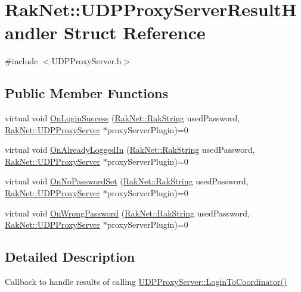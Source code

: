 \hypertarget{struct_rak_net_1_1_u_d_p_proxy_server_result_handler}{\section{Rak\-Net\-:\-:U\-D\-P\-Proxy\-Server\-Result\-Handler Struct Reference}
\label{struct_rak_net_1_1_u_d_p_proxy_server_result_handler}
}


{\ttfamily \#include $<$U\-D\-P\-Proxy\-Server.\-h$>$}

\subsection*{Public Member Functions}
\begin{DoxyCompactItemize}
\item 
virtual void \hyperlink{struct_rak_net_1_1_u_d_p_proxy_server_result_handler_a81c11c14b38ec6aee2d1e8d9a5afdcc5}{On\-Login\-Success} (\hyperlink{class_rak_net_1_1_rak_string}{Rak\-Net\-::\-Rak\-String} used\-Password, \hyperlink{class_rak_net_1_1_u_d_p_proxy_server}{Rak\-Net\-::\-U\-D\-P\-Proxy\-Server} $\ast$proxy\-Server\-Plugin)=0
\item 
virtual void \hyperlink{struct_rak_net_1_1_u_d_p_proxy_server_result_handler_a74abda172d71013f9375e82234c4555d}{On\-Already\-Logged\-In} (\hyperlink{class_rak_net_1_1_rak_string}{Rak\-Net\-::\-Rak\-String} used\-Password, \hyperlink{class_rak_net_1_1_u_d_p_proxy_server}{Rak\-Net\-::\-U\-D\-P\-Proxy\-Server} $\ast$proxy\-Server\-Plugin)=0
\item 
virtual void \hyperlink{struct_rak_net_1_1_u_d_p_proxy_server_result_handler_ac9b3d9c8a27c1f3a086071615290bc72}{On\-No\-Password\-Set} (\hyperlink{class_rak_net_1_1_rak_string}{Rak\-Net\-::\-Rak\-String} used\-Password, \hyperlink{class_rak_net_1_1_u_d_p_proxy_server}{Rak\-Net\-::\-U\-D\-P\-Proxy\-Server} $\ast$proxy\-Server\-Plugin)=0
\item 
virtual void \hyperlink{struct_rak_net_1_1_u_d_p_proxy_server_result_handler_a9246b42361a5e471e3a41f2e4303b170}{On\-Wrong\-Password} (\hyperlink{class_rak_net_1_1_rak_string}{Rak\-Net\-::\-Rak\-String} used\-Password, \hyperlink{class_rak_net_1_1_u_d_p_proxy_server}{Rak\-Net\-::\-U\-D\-P\-Proxy\-Server} $\ast$proxy\-Server\-Plugin)=0
\end{DoxyCompactItemize}


\subsection{Detailed Description}
Callback to handle results of calling \hyperlink{class_rak_net_1_1_u_d_p_proxy_server_a32edaff2aec11cce6a138897b0e2a158}{U\-D\-P\-Proxy\-Server\-::\-Login\-To\-Coordinator()} 

